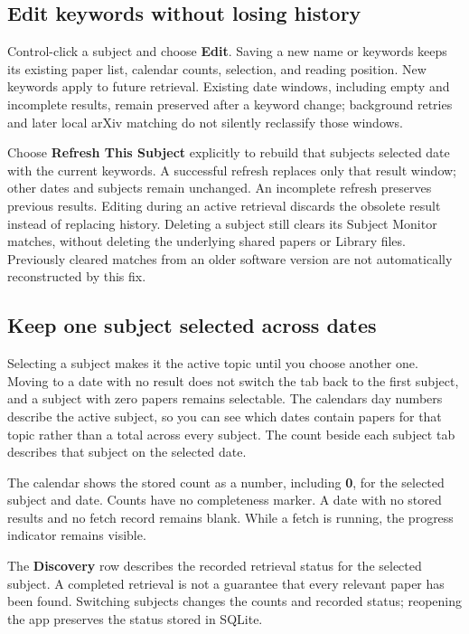 \documentclass[10pt,letterpaper,oneside]{scrreprt}
\begin{document}
\subsection{Edit keywords without losing history}\label{edit-keywords-without-losing-history}

Control-click a subject and choose \textbf{Edit}. Saving a new name or keywords keeps its existing paper list, calendar counts, selection, and reading position. New keywords apply to future retrieval. Existing date windows, including empty and incomplete results, remain preserved after a keyword change; background retries and later local arXiv matching do not silently reclassify those windows.

Choose \textbf{Refresh This Subject} explicitly to rebuild that subject\textquotesingle s selected date with the current keywords. A successful refresh replaces only that result window; other dates and subjects remain unchanged. An incomplete refresh preserves previous results. Editing during an active retrieval discards the obsolete result instead of replacing history. Deleting a subject still clears its Subject Monitor matches, without deleting the underlying shared papers or Library files. Previously cleared matches from an older software version are not automatically reconstructed by this fix.

\subsection{Keep one subject selected across dates}\label{keep-one-subject-selected-across-dates}

Selecting a subject makes it the active topic until you choose another one. Moving to a date with no result does not switch the tab back to the first subject, and a subject with zero papers remains selectable. The calendar\textquotesingle s day numbers describe the active subject, so you can see which dates contain papers for that topic rather than a total across every subject. The count beside each subject tab describes that subject on the selected date.

The calendar shows the stored count as a number, including \textbf{0}, for the selected subject and date. Counts have no completeness marker. A date with no stored results and no fetch record remains blank. While a fetch is running, the progress indicator remains visible.

The \textbf{Discovery} row describes the recorded retrieval status for the selected subject. A completed retrieval is not a guarantee that every relevant paper has been found. Switching subjects changes the counts and recorded status; reopening the app preserves the status stored in SQLite.
\end{document}
